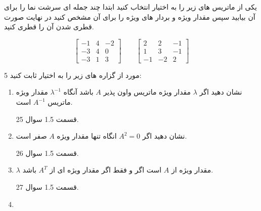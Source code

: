 \documentclass{article}
\begin{document}
	\clearpage
	 یکی از ماتریس های زیر  را به اختیار انتخاب کنید ابتدا چند جمله ای سرشت نما را برای آن بیابید سپس مقدار ویژه و بردار های ویژه را برای آن  مشخص کنید  در نهایت صورت قطری شدن آن را قطری کنید.
	
	$$\begin{bmatrix}
	-1&4&-2\\
	-3&4&0\\
	-3&1&3
	\end{bmatrix} \qquad
	\begin{bmatrix}
	2&2&-1\\
	1&3&-1\\
	-1&-2&2
	\end{bmatrix}
	$$
	
	5 مورد از گزاره های زیر را به اختیار ثابت کنید:
	\begin{enumerate}
		\item 
		نشان دهید اگر 
		$\lambda$
		مقدار ویژه ماتریس واون پذیر 
		$A$
		باشد آنگاه 
		$\lambda^{-1}$
		مقدار ویژه ماتریس 
		$A^{-1}$
		است.
		\begin{حل}
			قسمت 1.5 سوال 25.
		\end{حل}
		\item 
		نشان دهید اگر 
		$A^2=0$
		انگاه تنها  مقدار ویژه 
		$A$
		صفر است.
		\begin{حل}
			قسمت 1.5 سوال 26.
		\end{حل}
		\item 
		$\lambda$
		مقدار ویژه از 
		$A$
		است اگر و فقط اگر 
		مقدار ویژه ای از 
		$A^{T}$
		باشد.
		\begin{حل}
			قسمت 1.5 سوال 27.
		\end{حل}
		\item
		

\end{enumerate}
\end{document}
